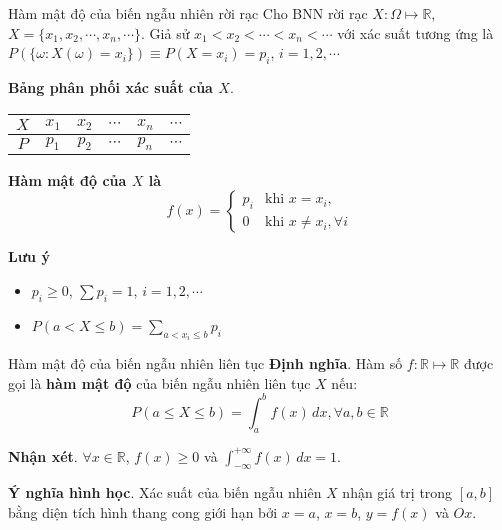 \documentclass[aspectratio=169,xcolor=dvipsnames,serif]{beamer}
\begin{document}
\begin{frame}{Hàm mật độ của biến ngẫu nhiên rời rạc}
    Cho BNN rời rạc $X: \Omega \mapsto \mathbb{R}$, $X = \{x_1, x_2, \cdots, x_n, \cdots\}$. Giả sử $x_1 < x_2 < \cdots < x_n < \cdots$ với xác suất tương ứng là $P(\{\omega: X(\omega)=x_i\}) \equiv P(X=x_i) = p_i$, $i = 1, 2, \cdots$
    
    \textbf{Bảng phân phối xác suất của $X$}.
    
    \begin{table}
        \begin{tabular}{c|c c c c c}
            $X$ & $x_1$ & $x_2$ & $\cdots$ & $x_n$ & $\cdots$ \\ \hline $P$ & $p_1$ & $p_2$ & $\cdots$ & $p_n$ & $\cdots$
        \end{tabular}
    \end{table}
    
    \textbf{Hàm mật độ của $X$ là} \[f(x) = \begin{cases}
         p_i & \text{khi } x = x_i, \\
         0 & \text{khi } x \neq x_i, \forall i
    \end{cases}\]
    
    \textbf{Lưu ý}
    
    \begin{itemize}
        \item $p_i \geq 0$, $\sum p_i = 1$, $i = 1, 2, \cdots$

        \item $P(a < X \leq b) = \sum_{a < x_i \leq b}p_i$
    \end{itemize}
\end{frame}

\begin{frame}{Hàm mật độ của biến ngẫu nhiên liên tục}
    \textbf{Định nghĩa}. Hàm số $f: \mathbb{R} \mapsto \mathbb{R}$ được gọi là \textbf{hàm mật độ} của biến ngẫu nhiên liên tục $X$ nếu: \[P(a \leq X \leq b) = \displaystyle{\int_a^b f(x)\,dx}, \forall a, b \in \mathbb{R}\]
    
    \textbf{Nhận xét}. $\forall x \in \mathbb{R}$, $f(x) \geq 0$ và \begin{math}\int_{-\infty}^{+\infty}f(x)\,dx = 1\end{math}.
    
    \textbf{Ý nghĩa hình học}. Xác suất của biến ngẫu nhiên $X$ nhận giá trị trong $[a, b]$ bằng diện tích hình thang cong giới hạn bởi $x=a$, $x=b$, $y=f(x)$ và $Ox$.
\end{frame}
\end{document}
